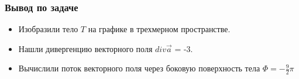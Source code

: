 \begin{frame}\frametitle{Вывод по задаче}
	\begin{itemize}
		\item Изобразили тело \(T\) на графике в трехмерном пространстве.

		\item Нашли дивергенцию векторного поля \(div \vec a\) = -3.

		\item Вычислили поток векторного поля через боковую поверхность тела \(\Phi = -\frac{9}{2}\pi \)
	\end{itemize}

\end{frame}
